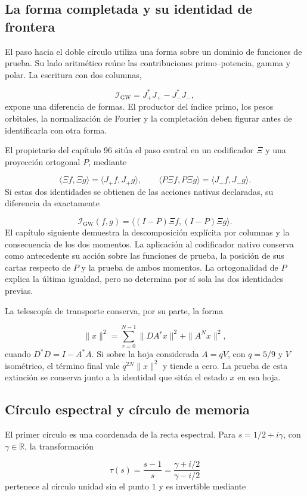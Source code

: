 \subsection{La forma completada y su identidad de frontera}
El paso hacia el doble círculo utiliza una forma sobre un dominio de funciones de prueba. Su lado aritmético reúne las contribuciones primo–potencia, gamma y polar. La escritura con dos columnas,

\[
\mathscr I_{\mathrm{GW}}=J_+^*J_+-J_-^*J_-,
\]
expone una diferencia de formas. El productor del índice primo, los pesos orbitales, la normalización de Fourier y la completación deben figurar antes de identificarla con otra forma.

El propietario del capítulo 96 sitúa el paso central en un codificador $\Xi$ y una proyección ortogonal $P$, mediante

\[
\langle\Xi f,\Xi g\rangle=\langle J_+f,J_+g\rangle,
\qquad
\langle P\Xi f,P\Xi g\rangle=\langle J_-f,J_-g\rangle.
\]
Si estas dos identidades se obtienen de las acciones nativas declaradas, su diferencia da exactamente

\[
\mathscr I_{\mathrm{GW}}(f,g)
=\langle(I-P)\Xi f,(I-P)\Xi g\rangle.
\]
El capítulo siguiente demuestra la descomposición explícita por columnas y la consecuencia de los dos momentos. La aplicación al codificador nativo conserva como antecedente su acción sobre las funciones de prueba, la posición de sus cartas respecto de $P$ y la prueba de ambos momentos. La ortogonalidad de $P$ explica la última igualdad, pero no determina por sí sola las dos identidades previas.

La telescopía de transporte conserva, por su parte, la forma

\[
\|x\|^2=\sum_{r=0}^{N-1}\|DA^rx\|^2+\|A^Nx\|^2,
\]
cuando $D^*D=I-A^*A$. Si sobre la hoja considerada $A=qV$, con $q=5/9$ y $V$ isométrico, el término final vale $q^{2N}\|x\|^2$ y tiende a cero. La prueba de esta extinción se conserva junto a la identidad que sitúa el estado $x$ en esa hoja.

\subsection{Círculo espectral y círculo de memoria}
El primer círculo es una coordenada de la recta espectral. Para $s=1/2+i\gamma$, con \(\gamma\in\mathbb R\), la transformación

\[
\tau(s)=\frac{s-1}{s}
=\frac{\gamma+i/2}{\gamma-i/2}
\]
pertenece al círculo unidad sin el punto \(1\) y es invertible mediante

